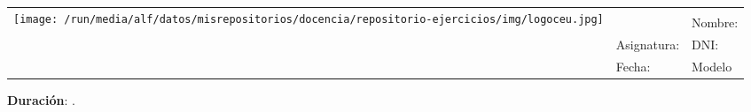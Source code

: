 \documentclass[a4paper]{article}
\makeatletter
\newcommand{\myTitle}{\@Title}
\newcommand{\mySubject}{\@Subject}
\newcommand{\myDegree}{\@Degree}
\newcommand{\myDate}{\@Date}
\newcommand{\myVersion}{\@Version}
\newcommand{\myTime}{\@Time}
\makeatother
\begin{document}
\begin{center}
\doublespacing
\sffamily
\begin{tabular}{|p{}|p{}|p{}|}
\hline
\multirow{4}{*}{\texttt{[image: /run/media/alf/datos/misrepositorios/docencia/repositorio-ejercicios/img/logoceu.jpg]}} & \multicolumn{2}{p{0.77\textwidth}|}{\centering \Large \textbf{\myTitle}} \\
\cline{2-3}
& \myDegree & Nombre: \\
\cline{2-3}
& Asignatura: \mySubject & DNI: \\
\cline{2-3}
& Fecha: \myDate & Modelo \myVersion\\
\hline
\end{tabular}
\end{center}

\noindent\textbf{Duración}: \myTime. \vskip 1cm

\begin{enumerate}[leftmargin=*]

\end{enumerate}
\end{document}
